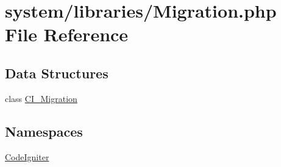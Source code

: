 \hypertarget{system_2libraries_2migration_8php}{}\section{system/libraries/\+Migration.php File Reference}
\label{system_2libraries_2migration_8php}
\subsection*{Data Structures}
\begin{DoxyCompactItemize}
\item 
class \mbox{\hyperlink{class_c_i___migration}{C\+I\+\_\+\+Migration}}
\end{DoxyCompactItemize}
\subsection*{Namespaces}
\begin{DoxyCompactItemize}
\item 
 \mbox{\hyperlink{namespace_code_igniter}{Code\+Igniter}}
\end{DoxyCompactItemize}
